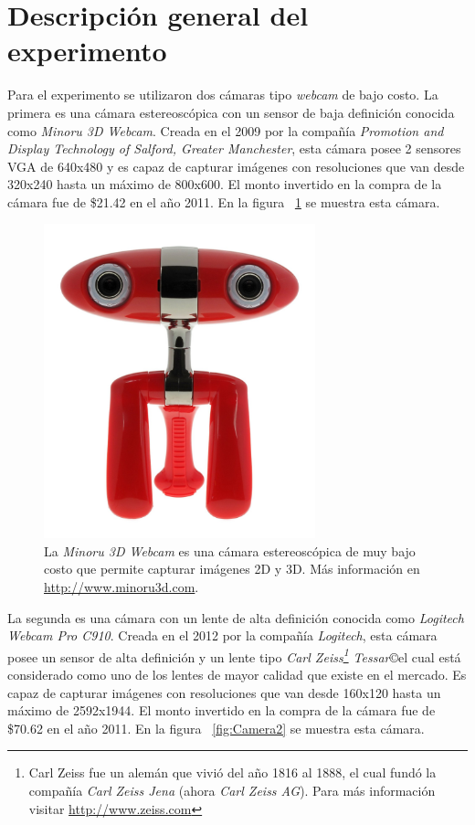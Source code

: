 \section{Descripci\'{o}n general del experimento}
Para el experimento se utilizaron dos c\'{a}maras tipo \textit{webcam} de bajo costo. La primera es una c\'{a}mara estereosc\'{o}pica con un sensor de baja definici\'{o}n conocida como \textit{Minoru 3D Webcam}. Creada en el 2009 por la compa\~n\'{i}a \textit{Promotion and Display Technology of Salford, Greater Manchester}, esta c\'{a}mara posee 2 sensores VGA de 640x480 y es capaz de capturar im\'{a}genes con resoluciones que van desde 320x240 hasta un m\'{a}ximo de 800x600. El monto invertido en la compra de la c\'{a}mara fue de \$21.42 en el a\~no 2011. En la figura ~\ref{fig:Camera1} se muestra esta c\'{a}mara.


\begin{figure}[H]
\centering
\includegraphics[width=0.7\textwidth]{images/camara1.jpg}
\caption[Minoru 3D Webcam]%
{La \textit{Minoru 3D Webcam} es una c\'{a}mara estereosc\'{o}pica de muy bajo costo que permite capturar im\'{a}genes 2D y 3D. M\'{a}s informaci\'{o}n en \url{http://www.minoru3d.com}.}
\label{fig:Camera1}
\end{figure}


La segunda es una c\'{a}mara con un lente de alta definici\'{o}n conocida como \textit{Logitech Webcam Pro C910}. Creada en el 2012 por la compa\~n\'{i}a \textit{Logitech}, esta c\'{a}mara posee un sensor de alta definici\'{o}n y un lente tipo \textit{Carl Zeiss\footnote{Carl Zeiss fue un alem\'{a}n que vivi\'{o} del a\~no 1816 al 1888, el cual fund\'{o} la compa\~n\'{i}a \textit{Carl Zeiss Jena} (ahora \textit{Carl Zeiss AG}). Para m\'{a}s informaci\'{o}n visitar \url{http://www.zeiss.com}} Tessar}\copyright el cual est\'{a} considerado como uno de los lentes de mayor calidad que existe en el mercado. Es capaz de capturar im\'{a}genes con resoluciones que van desde 160x120 hasta un m\'{a}ximo de 2592x1944. El monto invertido en la compra de la c\'{a}mara fue de \$70.62 en el a\~no 2011. En la figura ~\ref{fig:Camera2} se muestra esta c\'{a}mara.


